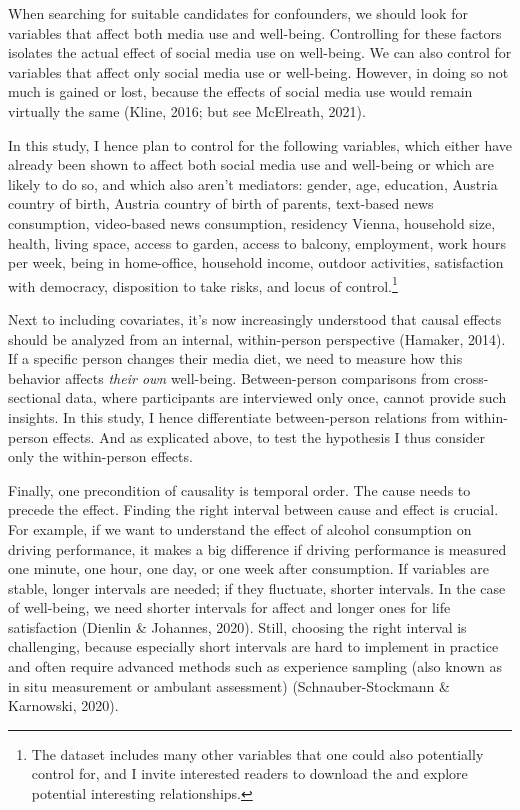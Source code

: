 \documentclass[
  man,mask]{apa6}
\begin{document}
When searching for suitable candidates for confounders, we should look for variables that affect both media use and well-being.
Controlling for these factors isolates the actual effect of social media use on well-being.
We can also control for variables that affect only social media use or well-being.
However, in doing so not much is gained or lost, because the effects of social media use would remain virtually the same (Kline, 2016; but see McElreath, 2021).

In this study, I hence plan to control for the following variables, which either have already been shown to affect both social media use and well-being or which are likely to do so, and which also aren't mediators:
gender, age, education, Austria country of birth, Austria country of birth of parents, text-based news consumption, video-based news consumption, residency Vienna, household size, health, living space, access to garden, access to balcony, employment, work hours per week, being in home-office, household income, outdoor activities, satisfaction with democracy, disposition to take risks, and locus of control.\footnote{The dataset includes many other variables that one could also potentially control for, and I invite interested readers to download the and explore potential interesting relationships.}

Next to including covariates, it's now increasingly understood that causal effects should be analyzed from an internal, within-person perspective (Hamaker, 2014).
If a specific person changes their media diet, we need to measure how this behavior affects \emph{their own} well-being.
Between-person comparisons from cross-sectional data, where participants are interviewed only once, cannot provide such insights.
In this study, I hence differentiate between-person relations from within-person effects.
And as explicated above, to test the hypothesis I thus consider only the within-person effects.

Finally, one precondition of causality is temporal order.
The cause needs to precede the effect.
Finding the right interval between cause and effect is crucial.
For example, if we want to understand the effect of alcohol consumption on driving performance, it makes a big difference if driving performance is measured one minute, one hour, one day, or one week after consumption.
If variables are stable, longer intervals are needed; if they fluctuate, shorter intervals.
In the case of well-being, we need shorter intervals for affect and longer ones for life satisfaction (Dienlin \& Johannes, 2020).
Still, choosing the right interval is challenging, because especially short intervals are hard to implement in practice and often require advanced methods such as experience sampling (also known as in situ measurement or ambulant assessment) (Schnauber-Stockmann \& Karnowski, 2020).
\end{document}
